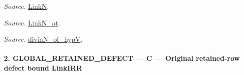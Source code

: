\documentclass[11pt,a4paper]{article}
\numberwithin{equation}{section}
\theoremstyle{remark}\newtheorem{remark}[theorem]{Remark}
\begin{document}
\emph{Source.} \href{https://github.com/CocoSgt/riemann-hypothesis-lean/blob/7cbf7a0c32fca1badf05931879a37c3f8a2b03b4/src/Formalism/SharpRestriction/GlobalTheoremInputs.lean#L45-L48}{LinkN}.

\emph{Source.} \href{https://github.com/CocoSgt/riemann-hypothesis-lean/blob/7cbf7a0c32fca1badf05931879a37c3f8a2b03b4/src/Formalism/SharpRestriction/GlobalTheoremInputs.lean#L40-L44}{LinkN\_\allowbreak at}.

\emph{Source.} \href{https://github.com/CocoSgt/riemann-hypothesis-lean/blob/7cbf7a0c32fca1badf05931879a37c3f8a2b03b4/src/Development/AutomorphicArithmetic/CharacterBoxes/DivinNOfHypV.lean#L117-L134}{divinN\_\allowbreak of\_\allowbreak hypV}.



\paragraph{2. GLOBAL\_\allowbreak RETAINED\_\allowbreak DEFECT — C — Original retained-row defect bound LinkIRR}
\end{document}
